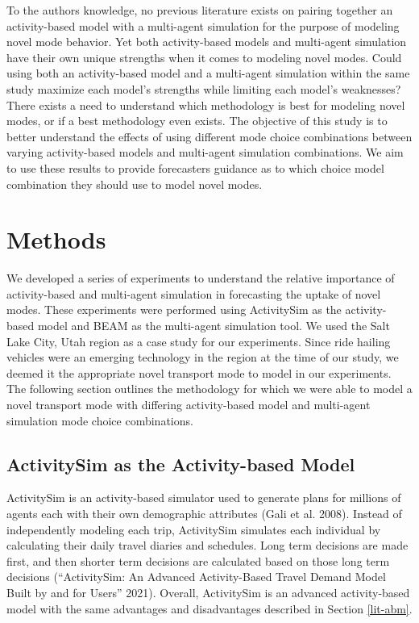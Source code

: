 \documentclass[12pt, oneside, openright]{byuthesis}
\begin{document}
To the authors knowledge, no previous literature exists on pairing together an activity-based model with a multi-agent simulation for the purpose of modeling novel mode behavior. Yet both activity-based models and multi-agent simulation have their own unique strengths when it comes to modeling novel modes. Could using both an activity-based model and a multi-agent simulation within the same study maximize each model's strengths while limiting each model's weaknesses? There exists a need to understand which methodology is best for modeling novel modes, or if a best methodology even exists. The objective of this study is to better understand the effects of using different mode choice combinations between varying activity-based models and multi-agent simulation combinations. We aim to use these results to provide forecasters guidance as to which choice model combination they should use to model novel modes.

\hypertarget{methods}{%
\chapter{Methods}\label{methods}}

We developed a series of experiments to understand the relative importance of activity-based and multi-agent simulation in forecasting the uptake of novel modes. These experiments were performed using ActivitySim as the activity-based model and BEAM as the multi-agent simulation tool. We used the Salt Lake City, Utah region as a case study for our experiments. Since ride hailing vehicles were an emerging technology in the region at the time of our study, we deemed it the appropriate novel transport mode to model in our experiments. The following section outlines the methodology for which we were able to model a novel transport mode with differing activity-based model and multi-agent simulation mode choice combinations.

\hypertarget{meth-asim}{%
\section{ActivitySim as the Activity-based Model}\label{meth-asim}}

ActivitySim is an activity-based simulator used to generate plans for millions of agents each with their own demographic attributes (Gali et al. 2008). Instead of independently modeling each trip, ActivitySim simulates each individual by calculating their daily travel diaries and schedules. Long term decisions are made first, and then shorter term decisions are calculated based on those long term decisions ({``ActivitySim: An Advanced Activity-Based Travel Demand Model Built by and for Users''} 2021). Overall, ActivitySim is an advanced activity-based model with the same advantages and disadvantages described in Section \ref{lit-abm}.
\end{document}
